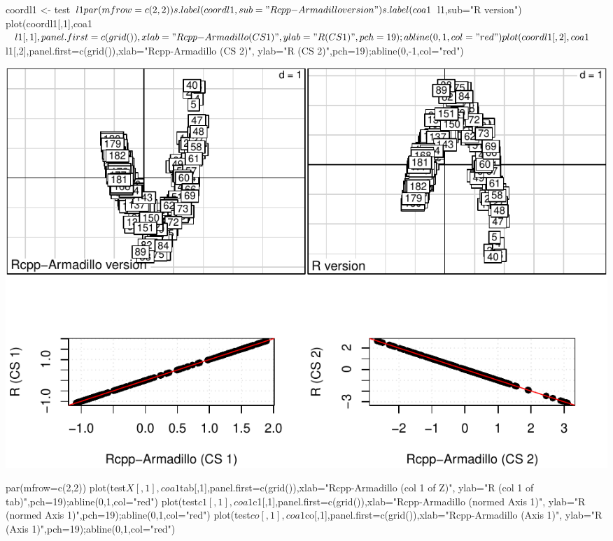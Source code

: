 \documentclass[
  10pt,
]{article}
\newenvironment{Shaded}{\begin{snugshade}}{\end{snugshade}}
\newcommand{\NormalTok}[1]{#1}
\begin{document}
\begin{Shaded}
\begin{Highlighting}[]
\NormalTok{coordl1 \textless{}{-} test$l1}
\NormalTok{par(mfrow=c(2,2))}
\NormalTok{s.label(coordl1,sub="Rcpp{-}Armadillo version")}
\NormalTok{s.label(coa1$l1,sub="R version")}
\NormalTok{plot(coordl1[,1],coa1$l1[,1],panel.first=c(grid()),xlab="Rcpp{-}Armadillo (CS 1)",}
\NormalTok{     ylab="R (CS 1)",pch=19);abline(0,1,col="red")}
\NormalTok{plot(coordl1[,2],coa1$l1[,2],panel.first=c(grid()),xlab="Rcpp{-}Armadillo (CS 2)",}
\NormalTok{     ylab="R (CS 2)",pch=19);abline(0,{-}1,col="red")}
\end{Highlighting}
\end{Shaded}

\includegraphics{RandPytonAnalysisPDF_files/figure-latex/unnamed-chunk-59-1.pdf}

\begin{Shaded}
\begin{Highlighting}[]
\NormalTok{par(mfrow=c(2,2))}
\NormalTok{plot(test$X[,1],coa1$tab[,1],panel.first=c(grid()),xlab="Rcpp{-}Armadillo (col 1 of Z)",}
\NormalTok{     ylab="R (col 1 of tab)",pch=19);abline(0,1,col="red")}
\NormalTok{plot(test$c1[,1],coa1$c1[,1],panel.first=c(grid()),xlab="Rcpp{-}Armadillo (normed Axis 1)",}
\NormalTok{     ylab="R (normed Axis 1)",pch=19);abline(0,1,col="red")}
\NormalTok{plot(test$co[,1],coa1$co[,1],panel.first=c(grid()),xlab="Rcpp{-}Armadillo (Axis 1)",}
\NormalTok{     ylab="R (Axis 1)",pch=19);abline(0,1,col="red")}
\end{Highlighting}
\end{Shaded}
\end{document}
